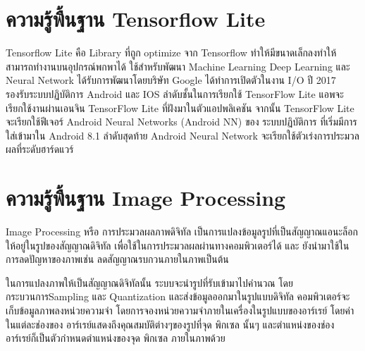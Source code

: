 	 
	 \section{ความรู้พื้นฐาน Tensorflow Lite}
	 Tensorflow Lite คือ Library ที่ถูก optimize จาก Tensorflow ทำให้มีขนาดเล็กลงทำให้สามารถทำงานบนอุปกรณ์พกพาได้ ใช้สำหรับพัฒนา Machine Learning Deep Learning และ Neural Network ได้รับการพัฒนาโดยบริษัท Google 
	 ได้ทำการเปิดตัวในงาน I/O ปี 2017 รองรับระบบปฏิบัติการ Android และ IOS ลำดับชั้นในการเรียกใช้ TensorFlow Lite แอพจะเรียกใช้งานผ่านเอนจิน TensorFlow Lite ที่ฝังมาในตัวแอปพลิเคชัน จากนั้น TensorFlow Lite จะเรียกใช้ฟีเจอร์ Android Neural Networks (Android NN) ของ ระบบปฏิบัติการ ที่เริ่มมีการใส่เข้ามาใน Android 8.1
	ลำดับสุดท้าย Android Neural Network จะเรียกใช้ตัวเร่งการประมวลผลที่ระดับฮาร์ดแวร์ 
		
	
    \section{ความรู้พื้นฐาน Image Processing}
		Image Processing \cite{imgp} หรือ การประมวลผลภาพดิจิทัล เป็นการแปลงข้อมูลรูปที่เป็นสัญญาณแอนะล็อกให้อยู่ในรูปของสัญญาณดิจิทัล เพื่อใช้ในการประมวลผลผ่านทางคอมพิวเตอร์ได้ และ ยังนำมาใช้ในการลดปัญหาของภาพเช่น ลดสัญญาณรบกวนภายในภาพเป็นต้น

		ในการแปลงภาพให้เป็นสัญญาณดิจิทัลนั้น ระบบจะนำรูปที่รับเข้ามาไปคำนวณ โดยกระบวนการSampling และ Quantization และส่งข้อมูลออกมาในรูปแบบดิจิทัล คอมพิวเตอร์จะเก็บข้อมูลภาพลงหน่วยความจำ โดยการจองหน่วยความจำภายในเครื่องในรูปแบบของอาร์เรย์ โดยค่าในแต่ละช่องของ อาร์เรย์แสดงถึงคุณสมบัติต่างๆของรูปที่จุด พิกเซล นั้นๆ และตำแหน่งของช่อง อาร์เรย์ก็เป็นตัวกำหนดตำแหน่งของจุด พิกเซล ภายในภาพด้วย
		
